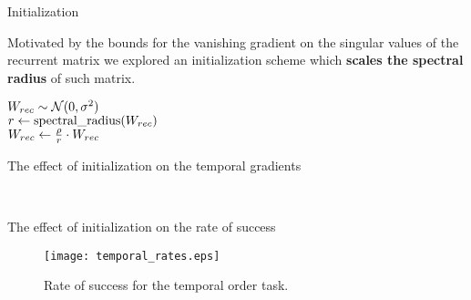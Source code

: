 \begin{frame}{Initialization}
	
Motivated by the bounds for the vanishing gradient on the singular values of the recurrent matrix we explored an initialization scheme which \textbf{scales the spectral radius} of such matrix.

\vspace{2em}

\begin{algorithm}[H]
	\BlankLine
	
	$W_{rec} \sim \mathcal{N}(0, \sigma^2)$\\
	$r \gets \mbox{spectral\_radius}(W_{rec})$\\
	$W_{rec}\gets \frac{\rho}{r} \cdot W_{rec}$\\
	\caption{Recurrent weight matrix initialization scheme}
	\label{algo:init_scaling}
\end{algorithm}
\end{frame}

\begin{frame}{The effect of initialization on the temporal gradients}
	\captionsetup[subfigure]{labelformat=empty}
		\begin{figure}
			\centering
			\\
			\vspace{-2em}
		\end{figure}
	
\end{frame}

\begin{frame}{The effect of initialization on the rate of success}
	\begin{figure}
		\centering
%		
		\texttt{[image: temporal\_rates.eps]}
		\caption{Rate of success for the temporal order task.}
		\label{fig:temporal_rates}
	\end{figure}
\end{frame}


